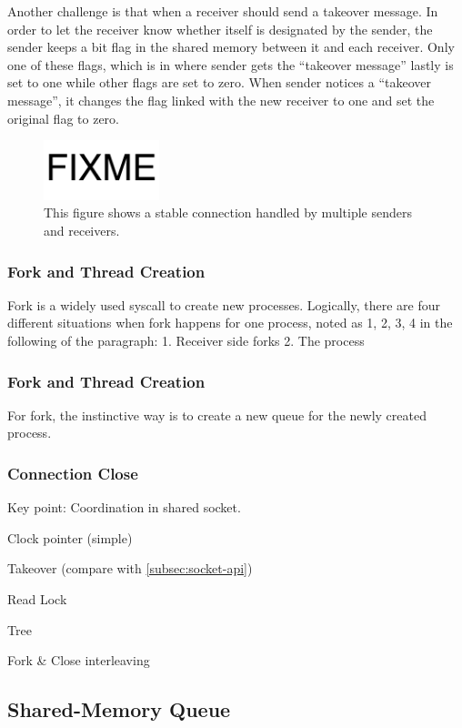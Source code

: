 Another challenge is that when a receiver should send a takeover message. In order to let the receiver know whether itself is designated by the sender, the sender keeps a bit flag in the shared memory between it and each receiver.  Only one of these flags, which is in where sender gets the ``takeover message'' lastly is set to one while other flags are set to zero. When sender notices a ``takeover message'', it changes the flag linked with the new receiver to one and set the original flag to zero.

\begin{figure}[t]
	\centering
	\includegraphics[width=0.3\textwidth]{images/fixme}
	\caption{This figure shows a stable connection handled by multiple senders and receivers.}
	\label{fig:fork-bipartitegraph}
\end{figure}

\subsubsection{Fork and Thread Creation}
Fork is a widely used syscall to create new processes. Logically, there are four different situations when fork happens for one process, noted as 1, 2, 3, 4 in the following of the paragraph: 1. Receiver side forks 2. The process

\subsubsection{Fork and Thread Creation}
For fork, the instinctive way is to create a new queue for the newly created process. 

\subsubsection{Connection Close}
  
Key point: Coordination in shared socket.

Clock pointer (simple)

Takeover (compare with \ref{subsec:socket-api})

Read Lock

Tree

Fork \& Close interleaving

\subsection{Shared-Memory Queue}


